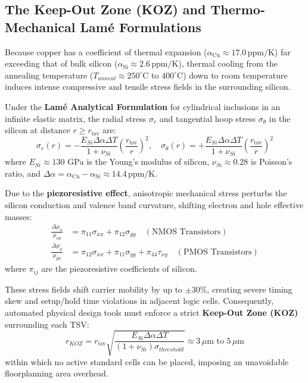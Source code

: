 \subsection{The Keep-Out Zone (KOZ) and Thermo-Mechanical Lamé Formulations}
\label{subsec:ch8_koz}

Because copper has a coefficient of thermal expansion ($\alpha_{\mathrm{Cu}} \approx 17.0\,\mathrm{ppm/K}$) far exceeding that of bulk silicon ($\alpha_{\mathrm{Si}} \approx 2.6\,\mathrm{ppm/K}$), thermal cooling from the annealing temperature ($T_{anneal} \approx 250^\circ\mathrm{C}$ to $400^\circ\mathrm{C}$) down to room temperature induces intense compressive and tensile stress fields in the surrounding silicon.

Under the \textbf{Lamé Analytical Formulation} for cylindrical inclusions in an infinite elastic matrix, the radial stress $\sigma_r$ and tangential hoop stress $\sigma_\theta$ in the silicon at distance $r \ge r_{\mathrm{tsv}}$ are:
\begin{equation}
\sigma_r(r) = -\frac{E_{Si} \Delta \alpha \Delta T}{1 + \nu_{Si}} \left(\frac{r_{\mathrm{tsv}}}{r}\right)^2, \quad \sigma_\theta(r) = +\frac{E_{Si} \Delta \alpha \Delta T}{1 + \nu_{Si}} \left(\frac{r_{\mathrm{tsv}}}{r}\right)^2
\label{eq:tsv_lame_stress}
\end{equation}
where $E_{Si} \approx 130\text{ GPa}$ is the Young's modulus of silicon, $\nu_{Si} \approx 0.28$ is Poisson's ratio, and $\Delta \alpha = \alpha_{\mathrm{Cu}} - \alpha_{\mathrm{Si}} \approx 14.4\,\mathrm{ppm/K}$.

Due to the \textbf{piezoresistive effect}, anisotropic mechanical stress perturbs the silicon conduction and valence band curvature, shifting electron and hole effective masses:
\begin{align}
\frac{\Delta \mu_n}{\mu_{n0}} &= \pi_{11} \sigma_{xx} + \pi_{12} \sigma_{yy} \quad (\text{NMOS Transistors}) \\
\frac{\Delta \mu_p}{\mu_{p0}} &= \pi_{12} \sigma_{xx} + \pi_{11} \sigma_{yy} + \pi_{44} \tau_{xy} \quad (\text{PMOS Transistors})
\end{align}
where $\pi_{ij}$ are the piezoresistive coefficients of silicon.

These stress fields shift carrier mobility by up to $\pm 30\%$, creating severe timing skew and setup/hold time violations in adjacent logic cells. Consequently, automated physical design tools must enforce a strict \textbf{Keep-Out Zone (KOZ)} surrounding each TSV:
\begin{equation}
r_{KOZ} = r_{\mathrm{tsv}} \sqrt{\frac{E_{Si} \Delta \alpha \Delta T}{(1 + \nu_{Si}) \sigma_{threshold}}} \approx 3\,\mu\mathrm{m}\text{ to }5\,\mu\mathrm{m}
\label{eq:rkoz}
\end{equation}
within which no active standard cells can be placed, imposing an unavoidable floorplanning area overhead.

